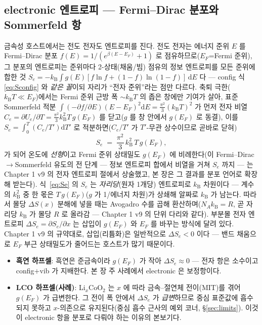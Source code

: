 \documentclass[11pt,a4paper]{article}
\newcommand{\dd}{\mathrm{d}}
\newcommand{\kB}{k_{\mathrm B}}
\begin{document}
\subsection{electronic 엔트로피 — Fermi--Dirac 분포와 Sommerfeld 항}\label{ssec:elec}
금속성 호스트에서는 전도 전자도 엔트로피를 진다. 전도 전자는 에너지 준위 $E$ 를 Fermi--Dirac 분포
$f(E)=1/(e^{\beta(E-E_F)}+1)$ 로 점유하므로($E_F$=Fermi 준위), 그 분포의 엔트로피는 준위마다 2-상태(채움/빔)
점유의 정보 엔트로피를 모든 준위에 합한 것 $S_e=-\kB\int g(E)[f\ln f+(1-f)\ln(1-f)]\,\dd E$ 다 — config 식
\eqref{eq:Sconfig} 와 \emph{같은 꼴}이되 자리가 ``전자 준위''라는 점만 다르다. 축퇴 극한($\kB T\ll E_F$)에서는
Fermi 준위 근방 폭 $\sim\kB T$ 의 좁은 창에만 기여가 살아, 표준 Sommerfeld 적분
$\int(-\partial f/\partial E)(E-E_F)^2\dd E=\tfrac{\pi^2}{3}(\kB T)^2$ 가 먼저 전자 비열 $C_e=\partial U_e/\partial T
=\tfrac{\pi^2}{3}\kB^2T\,g(E_F)$ 를 닫고($g$ 를 창 안에서 $g(E_F)$ 로 동결), 이를 $S_e=\int_0^T(C_e/T')\dd T'$ 로
적분하면($C_e/T'$ 가 $T'$-무관 상수이므로 곧바로 닫혀)
\begin{equation}
S_e \;=\; \frac{\pi^2}{3}\,\kB^2\,T\,g(E_F),
\label{eq:Se}
\end{equation}
가 되어 온도에 \emph{선형}이고 Fermi 준위 상태밀도 $g(E_F)$ 에 비례한다(이 Fermi--Dirac$\to$Sommerfeld
유도의 전 단계 — 정보 엔트로피 합에서 비열을 거쳐 $S_e$ 까지 — 는 Chapter 1 v9 의 전자 엔트로피 절에서 상술했고,
본 장은 그 결과를 분포 언어로 확장해 받는다). 식~\eqref{eq:Se} 의 $S_e$ 는 \emph{자리당}(원자 1개당) 엔트로피로
$\kB$ 차원이다 — 계수의 $\kB^2$ 중 한 몫은 $T\,g(E_F)$($g$ 가 1/에너지 차원)가 상쇄해 알짜로 $\kB$ 가 남는다.
따라서 몰당 $\Delta S(x)$ 분해에 넣을 때는 Avogadro 수를 곱해 환산하며($N_A\kB=R$, 곧 자리당 $\kB$ 가 몰당 $R$ 로
올라감 — Chapter 1 v9 의 단위 다리와 같다). 부분몰 전자 엔트로피
$\Delta S_e=\partial S_e/\partial x$ 는 삽입이 $g(E_F)$ 와 $E_F$ 를 바꾸는 방식에 달려 있다. Chapter 1 v9 의
규약대로, 삽입(리튬화)은 일반적으로 $\Delta S_e<0$ 이다 — 밴드 채움으로 $E_F$ 부근 상태밀도가 줄어드는 호스트가
많기 때문이다.
\begin{itemize}[leftmargin=1.4em,itemsep=1pt]
\item \textbf{흑연 하프셀}: 흑연은 준금속이라 $g(E_F)$ 가 작아 $\Delta S_e\approx0$ — 전자 항은 소수이고
config$+$vib 가 지배한다. 본 장 주 사례에서 electronic 은 보정항이다.
\item \textbf{LCO 하프셀(사례)}: Li$_x$CoO$_2$ 는 $x$ 에 따라 금속--절연체 전이(MIT)를 겪어 $g(E_F)$ 가
급변한다. 그 전이 폭 안에서 $\Delta S_e$ 가 \emph{급변}하므로 중심 표준값에 흡수되지 못하고 $x$-의존으로
유지된다(중심 흡수 근사의 예외 코너, \S\ref{sec:limits}). 이것이 electronic 항을 분포로 다뤄야 하는 이유의 본보기다.
\end{itemize}
\end{document}
